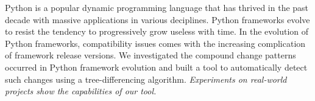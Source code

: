 

\begin{enabstract}

  Python is a popular dynamic programming language that has thrived in the past decade with massive applications in various deciplines. Python frameworks evolve to resist the tendency to progressively grow useless with time. In the evolution of Python frameworks, compatibility issues comes with the increasing complication of framework release versions. We investigated the compound change patterns occurred in Python framework evolution and built a tool to automatically detect such changes using a tree-differencing algorithm. \textit{Experiments on real-world projects show the capabilities of our tool.}


\end{enabstract}
